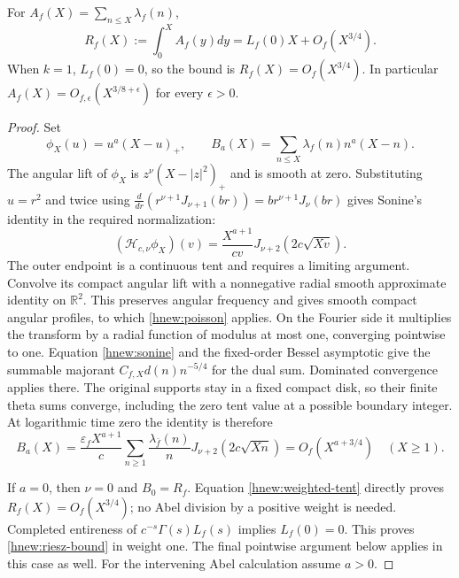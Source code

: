 \begin{proposition}\label{hnew:riesz}
For $A_f(X)=\sum_{n\le X}\lambda_f(n)$,
\begin{equation}\label{hnew:riesz-bound}
 R_f(X):=\int_0^XA_f(y)dy=L_f(0)X+O_f(X^{3/4}).
\end{equation}
When $k=1$, $L_f(0)=0$, so the bound is $R_f(X)=O_f(X^{3/4})$.
In particular $A_f(X)=O_{f,\epsilon}(X^{3/8+\epsilon})$ for
every $\epsilon>0$.
\end{proposition}
\begin{proof}
Set
\[
 \phi_X(u)=u^a(X-u)_+,\qquad
 B_a(X)=\sum_{n\le X}\lambda_f(n)n^a(X-n).
\]
The angular lift of $\phi_X$ is $z^\nu(X-|z|^2)_+$ and is smooth
at zero.  Substituting $u=r^2$ and twice using
$\frac d{dr}(r^{\nu+1}J_{\nu+1}(br))
 =br^{\nu+1}J_\nu(br)$ gives Sonine's identity in the required
normalization:
\begin{equation}\label{hnew:sonine}
 (\mathcal H_{c,\nu}\phi_X)(v)
       =\frac{X^{a+1}}{cv}J_{\nu+2}(2c\sqrt{Xv}).
\end{equation}
The outer endpoint is a continuous tent and requires a limiting
argument.  Convolve its compact angular lift with a nonnegative
radial smooth approximate identity on $\mathbb R^2$.
This preserves angular frequency and gives smooth compact angular
profiles, to which \eqref{hnew:poisson} applies.
On the Fourier side it multiplies the transform by a radial
function of modulus at most one, converging pointwise to one.
Equation \eqref{hnew:sonine} and the fixed-order Bessel asymptotic
give the summable majorant $C_{f,X}d(n)n^{-5/4}$ for the dual sum.
Dominated convergence applies there.  The original supports stay
in a fixed compact disk, so their finite theta sums converge,
including the zero tent value at a possible boundary integer.
At logarithmic time zero the identity is therefore
\begin{equation}\label{hnew:weighted-tent}
 B_a(X)=\frac{\varepsilon_fX^{a+1}}c
       \sum_{n\ge1}\frac{\lambda_{\bar f}(n)}n
               J_{\nu+2}(2c\sqrt{Xn})
       =O_f(X^{a+3/4})\quad(X\ge1).
\end{equation}

If $a=0$, then $\nu=0$ and $B_0=R_f$.
Equation \eqref{hnew:weighted-tent} directly proves
$R_f(X)=O_f(X^{3/4})$; no Abel division by a positive weight is
needed.  Completed entireness of
$c^{-s}\Gamma(s)L_f(s)$ implies $L_f(0)=0$.
This proves \eqref{hnew:riesz-bound} in weight one.
The final pointwise argument below applies in this case as well.
For the intervening Abel calculation assume $a>0$.


\end{proof}
